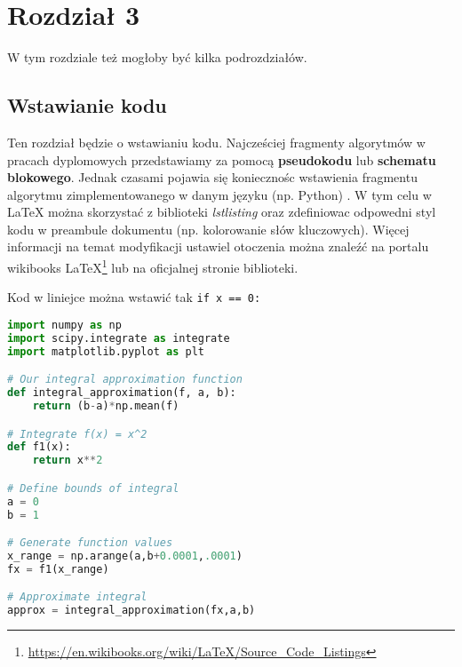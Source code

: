 \newpage %
\section{Rozdział 3}
W tym rozdziale też mogłoby być kilka podrozdziałów.


\subsection{Wstawianie kodu}
Ten rozdział będzie o wstawianiu kodu. Najcześciej fragmenty algorytmów w pracach dyplomowych przedstawiamy za pomocą \textbf{pseudokodu} lub \textbf{schematu blokowego}. Jednak czasami pojawia się koniecznośc wstawienia fragmentu algorytmu zimplementowanego w danym języku (np. Python) \citep{Teunissen.Montenbruck2017}. W tym celu w \LaTeX{} można skorzystać z biblioteki \emph{lstlisting} oraz zdefiniowac odpowedni styl kodu w preambule dokumentu (np. kolorowanie słów kluczowych). Więcej informacji na temat modyfikacji ustawiel otoczenia można znaleźć na portalu wikibooks \LaTeX{}\footnote{\url{https://en.wikibooks.org/wiki/LaTeX/Source_Code_Listings}} lub na oficjalnej stronie biblioteki.



Kod w liniejce można wstawić tak \lstinline|if x == 0:|

\begin{lstlisting}[language=Python,	caption={\emph{Przykładowy kod w Pythonie} }]
import numpy as np
import scipy.integrate as integrate
import matplotlib.pyplot as plt

# Our integral approximation function
def integral_approximation(f, a, b):
	return (b-a)*np.mean(f)

# Integrate f(x) = x^2
def f1(x):
	return x**2

# Define bounds of integral
a = 0
b = 1

# Generate function values
x_range = np.arange(a,b+0.0001,.0001)
fx = f1(x_range)

# Approximate integral
approx = integral_approximation(fx,a,b)
\end{lstlisting}



